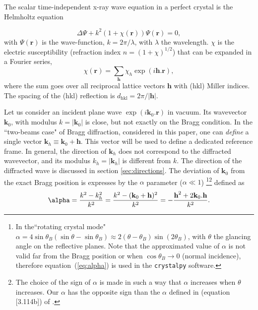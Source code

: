 \documentclass[preprint]{iucr}              %
\newcommand{\inblue}[1]{{\color{blue}#1}}
\begin{document}
The scalar time-independent x-ray wave equation in a perfect crystal is the Helmholtz equation

\begin{equation}
\label{eq:helmholz}
    \Delta \Psi + k^2 (1+\chi(\textbf{r})) \Psi(\textbf{r}) = 0,
\end{equation}
with $\Psi(\textbf{r})$ is the wave-function, $k=2\pi/\lambda$, with $\lambda$ the wavelength. $\chi$ is the electric susceptibility (refraction index $n=(1+\chi)^{1/2}$)
that can be expanded in a Fourier series,
\begin{equation}
\label{eq:chi}
    \chi(\textbf{r}) = \sum_{\textbf{h}} \chi_h \exp(i \textbf{h} . \textbf{r}),
\end{equation}
where 
the sum goes over all reciprocal lattice vectors $\textbf{h}$ with (hkl) Miller indices. 
The spacing of the (hkl) reflection is $d_\text{hkl}=2 \pi/|\textbf{h}|$.

Let us consider an incident plane wave $\exp(i\textbf{k}_0 . \textbf{r})$ in vacuum. Its wavevector $\textbf{k}_0$, with modulus $k=|\textbf{k}_0|$ is \inblue{close,
but not exactly on the Bragg condition.} 
In the ``two-\inblue{beams} case" of Bragg diffraction, considered in this paper, one can \textit{define} a single vector $\textbf{k}_h \equiv \textbf{k}_0+\textbf{h}$. This vector will be used to define a dedicated reference frame. In general, the direction of $\textbf{k}_h$ does not correspond to the diffracted wavevector, and its modulus $k_h=|\textbf{k}_h|$ is different from $k$. The direction of the diffracted wave is discussed in section \ref{sec:directions}. 
The deviation of $\textbf{k}_0$ from the exact Bragg position is expresses by the $\alpha$ parameter ($\alpha \ll 1$)
 \footnote{In the``rotating crystal mode" $\alpha=4 \sin \theta_B (\sin \theta - \sin \theta_B) \approx 2 (\theta-\theta_B) \sin (2\theta_B)$, with $\theta$ the glancing angle on the reflective planes. Note that the approximated value of $\alpha$ is not valid far from the Bragg position or when $\cos\theta_B \rightarrow 0$ (normal incidence), therefore  equation~(\ref{eq:alpha}) is used in the {\tt crystalpy} software. }\footnote{
 The choice of the sign of $\alpha$ is made in such a way that $\alpha$ increases when $\theta$ increases. Our $\alpha$ has the opposite sign than the $\alpha$ defined in (equation [3.114b]) of \cite{ZachariasenBook}. 
 } defined as
\begin{equation}
\label{eq:alpha}
\alpha = \frac{k^2-k_h^2}{k^2} = \frac{k^2-(\textbf k_0 + \textbf h)^2}{k^2} = - \frac{\textbf h^2 + 2 \textbf k_0 . \textbf h}{k^2}.
\end{equation}
\end{document}
